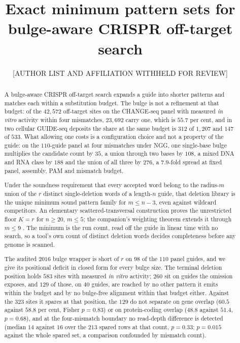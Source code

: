 \documentclass[11pt,letterpaper]{article}
\providecommand{\authorblock}{Amirhossein Daneshpajouh \and Megan Fowler \and Kay C. Wiese\\
  School of Computing Science, Simon Fraser University}
\renewcommand{\authorblock}{\normalsize [AUTHOR LIST AND AFFILIATION WITHHELD FOR REVIEW]}%
\begin{document}
\title{Exact minimum pattern sets for bulge-aware CRISPR off-target search}
\author{\authorblock}
\date{}
\maketitle
\thispagestyle{empty}

\begin{abstract}
A bulge-aware CRISPR off-target search expands a guide into shorter patterns and matches
each within a substitution budget. The bulge is not a refinement at that budget: of the
$42{,}572$ off-target sites on the CHANGE-seq panel with measured \emph{in vitro} activity
within four mismatches, $23{,}692$ carry one, which is $55.7$ per cent, and in two cellular
GUIDE-seq deposits the share at the same budget is $312$ of $1{,}207$ and $147$ of $533$.
What allowing one
costs is a configuration choice and not a property of the guide: on the $110$-guide panel at
four mismatches under NGG, one single-base bulge multiplies the candidate count by $35$, a
union through two bases by $108$, a mixed DNA and RNA class by $188$ and the union of all
three by $276$, a $7.9$-fold spread at fixed panel, assembly, PAM and mismatch budget.

Under the soundness requirement that every accepted word belong to the radius-$m$ union of
the $r$ distinct single-deletion words of a length-$n$ guide, that deletion library is the
unique minimum sound pattern family for $m\le n-3$, even against wildcard competitors. An
elementary scattered-transversal construction proves the unrestricted floor $K=r$ for
$n\ge20$, $m\le5$; the companion's weighting theorem extends it through $m\le9$
\citep{companion_reach}. The minimum is the run count, read off the guide in linear time
with no search, so a tool's own count of distinct deletion words decides completeness
before any genome is scanned.

The audited $2016$ bulge wrapper is short of $r$ on $98$ of the $110$ panel guides, and we
give its positional deficit in closed form for every bulge size. The terminal deletion
position holds $583$ sites with measured \emph{in vitro} activity; $260$ sit on guides the
omission exposes, and
$129$ of those, on $40$ guides, are reached by no other pattern it emits within the budget
and by no bulge-free alignment within that budget either. Against the $323$ sites it spares at that
position, the $129$ do not separate on gene overlap ($60.5$ against $58.8$ per cent, Fisher
$p=0.83$) or on protein-coding overlap ($48.8$ against $51.4$, $p=0.68$), and at the
four-mismatch boundary no read-depth difference is detected (median $14$ against $16$ over
the $213$ spared rows at that count, $p=0.33$; $p=0.015$ against the whole spared set, a
comparison confounded by mismatch count).


\end{abstract}
\end{document}

